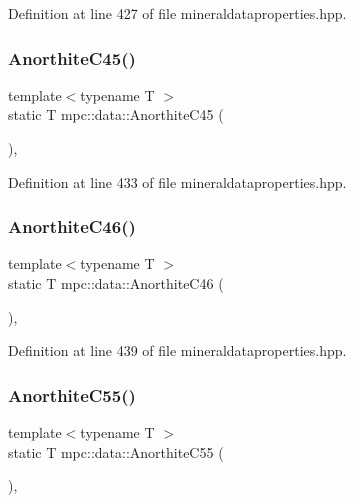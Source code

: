 Definition at line 427 of file mineraldataproperties.\+hpp.

\mbox{\label{namespacempc_1_1data_af211583e8b156ee78c9dada8a36c229d}} 
\subsubsection{\texorpdfstring{Anorthite\+C45()}{AnorthiteC45()}}
{\footnotesize\ttfamily template$<$typename T $>$ \\
static T mpc\+::data\+::\+Anorthite\+C45 (\begin{DoxyParamCaption}{ }\end{DoxyParamCaption})\hspace{0.3cm}{\ttfamily [inline]}, {\ttfamily [static]}}



Definition at line 433 of file mineraldataproperties.\+hpp.

\mbox{\label{namespacempc_1_1data_ab7379a7da73a9e228896a6f48d690a9e}} 
\subsubsection{\texorpdfstring{Anorthite\+C46()}{AnorthiteC46()}}
{\footnotesize\ttfamily template$<$typename T $>$ \\
static T mpc\+::data\+::\+Anorthite\+C46 (\begin{DoxyParamCaption}{ }\end{DoxyParamCaption})\hspace{0.3cm}{\ttfamily [inline]}, {\ttfamily [static]}}



Definition at line 439 of file mineraldataproperties.\+hpp.

\mbox{\label{namespacempc_1_1data_ac1e80b87de32e633a36cc5e6891b00c9}} 
\subsubsection{\texorpdfstring{Anorthite\+C55()}{AnorthiteC55()}}
{\footnotesize\ttfamily template$<$typename T $>$ \\
static T mpc\+::data\+::\+Anorthite\+C55 (\begin{DoxyParamCaption}{ }\end{DoxyParamCaption})\hspace{0.3cm}{\ttfamily [inline]}, {\ttfamily [static]}}




